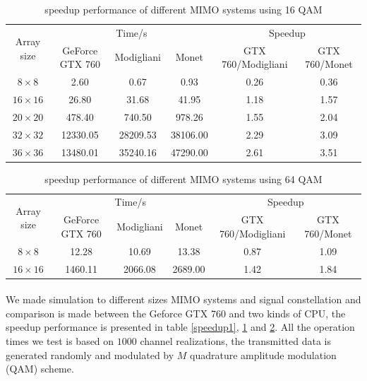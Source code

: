 \documentclass[12pt,a4paper,final]{article}
\begin{document}
\begin{spacing}{2.5}
\begin{table}[htb]
\centering
\begin{tabular}{|c|c|c|c|c|c|}
\hline
\multirow{2}{*}{ Array size} & \multicolumn{3}{|c|}{Time/s} & \multicolumn{2}{|c|}{Speedup}\\
\cline{2-6}
&GeForce GTX 760 & Modigliani & Monet &  GTX 760/Modigliani  &  GTX 760/Monet \\
\hline
$8\times 8$&2.60& 0.67&0.93 & 0.26&0.36 \\
\hline
$16\times 16$&26.80 & 31.68&41.95& 1.18& 1.57\\
\hline
$20\times 20$&478.40 & 740.50& 978.26& 1.55& 2.04\\
\hline
$32\times 32$&12330.05& 28209.53& 38106.00& 2.29& 3.09\\
\hline
$36\times 36$& 13480.01&35240.16&47290.00&2.61& 3.51 \\
\hline
\end{tabular}
\caption{speedup performance of different MIMO systems using 16 QAM}
\label{speedup2}
\end{table}

\begin{table}[tb]
\centering
\begin{tabular}{|c|c|c|c|c|c|}
\hline
\multirow{2}{*}{ Array size} & \multicolumn{3}{|c|}{Time/s} & \multicolumn{2}{|c|}{Speedup}\\
\cline{2-6}
&GeForce GTX 760 & Modigliani & Monet &  GTX 760/Modigliani  &  GTX 760/Monet \\
\hline
$8\times 8$&12.28& 10.69&13.38 & 0.87&1.09 \\
\hline
$16\times 16$&1460.11 & 2066.08&2689.00& 1.42& 1.84\\

\hline

\end{tabular}
\caption{speedup performance of different MIMO systems using 64 QAM}
\label{speedup3}
\end{table}

\paragraph{} We made simulation to different sizes MIMO systems and signal constellation and comparison is made between the Geforce GTX 760 and two kinds of CPU, the speedup performance is presented in table \ref{speedup1}, \ref{speedup2} and \ref{speedup3}. All the operation times we test is based on $1000$ channel realizations, the transmitted data is generated randomly and modulated by $M$ quadrature amplitude modulation (QAM) scheme.

\end{spacing}
\end{document}
